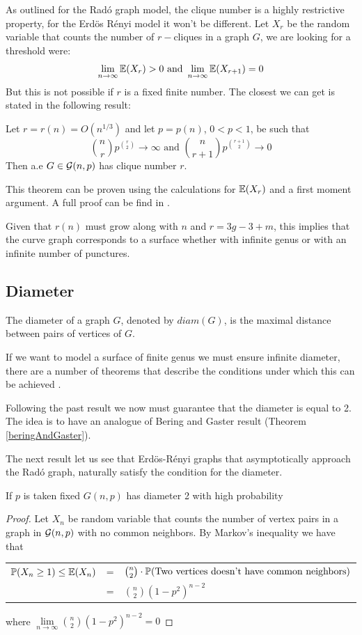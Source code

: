As outlined for the Radó graph model, the clique number is a highly restrictive property, for the Erdös Rényi model it won't be different. Let $X_r$ be the random variable that counts the number of $r-$cliques in a graph $G$, we are looking for a threshold were:
$$\lim\limits_{n \to \infty}\E(X_{r}) > 0 \text{ and } \lim\limits_{n \to \infty}\E (X_{r+1}) = 0$$
But this is not possible if $r$ is a fixed finite number. The closest we can get is stated in the following result:
\begin{theorem}\label{cliqueNumberER}
Let $r = r(n) = O(n^{1/3})$ and let $p=p(n)$, $0<p<1$, be such that
$$\binom{n}{r} p^{\binom{r}{2}} \to \infty \text{ and } \binom{n}{r+1} p^{\binom{r+1}{2}} \to 0 $$
Then a.e $G\in\G(n,p)$ has clique number $r$.
\end{theorem}

 This theorem can be proven using the calculations for $\E(X_{r})$ and a first moment argument. A full proof can be find in \cite[Bollobás, p.~290]{Bollobas}.

Given that $r(n)$ must grow along with $n$ and $r=3g-3+m$, this implies that the curve graph corresponds to a surface whether with infinite genus or with an infinite number of punctures.

\subsection{Diameter}

The diameter of a graph $G$, denoted by $diam(G)$, is the maximal distance between pairs of vertices of $G$.

If we want to model a surface of finite genus we must ensure infinite diameter, there are a number of theorems that describe the conditions under which this can be achieved \cite[Bollobás, p.~259]{Bollobas}.

Following the past result we now must guarantee that the diameter is equal to 2. The idea is to have an analogue of Bering and Gaster result (Theorem \ref{beringAndGaster}).

The next result let us see that Erdös-Rényi graphs that asymptotically approach the Radó graph, naturally satisfy the condition for the diameter.

\begin{theorem}
If $p$ is taken fixed $G(n,p)$ has diameter 2 with high probability 
\end{theorem}

\begin{proof}
Let $X_{n}$ be random variable that counts the number of vertex pairs in a graph in $\G(n,p)$ with no common neighbors. By Markov's inequality we have that
\begin{center}
\begin{tabular}{ r c l }
 $\P(X_{n} \geq 1)\leq \E(X_{n})$ & = & $\binom{n}{2} \cdot \P(\text{Two vertices doesn't have common neighbors})$ \\
 & = & $\binom{n}{2} (1-p^{2})^{n-2}$
\end{tabular}
\end{center}
where $\lim\limits_{n \to \infty}\binom{n}{2} (1-p^{2})^{n-2} = 0$
\end{proof}

